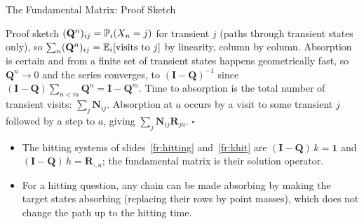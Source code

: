 \begin{frame}{The Fundamental Matrix: Proof Sketch}
  \label{fr:fundproof}
  \small
  \begin{block}{Proof sketch}
    $(\mathbf Q^n)_{ij}=\mathbb{P}_i(X_n=j)$ for transient $j$ (paths through transient states only), so $\sum_n(\mathbf Q^n)_{ij}=\mathbb{E}_i[\text{visits to } j]$ by linearity, column by column. Absorption is certain and from a finite set of transient states happens geometrically fast, so $\mathbf Q^n\to0$ and the series converges, to $(\mathbf I-\mathbf Q)^{-1}$ since $(\mathbf I-\mathbf Q)\sum_{n<m}\mathbf Q^n=\mathbf I-\mathbf Q^m$. Time to absorption is the total number of transient visits: $\sum_j\mathbf N_{ij}$. Absorption at $a$ occurs by a visit to some transient $j$ followed by a step to $a$, giving $\sum_j\mathbf N_{ij}\mathbf R_{ja}$. \hfill$\square$
  \end{block}
  \begin{itemize}
    \item The hitting systems of slides~\ref{fr:hitting} and~\ref{fr:khit} are $(\mathbf I-\mathbf Q)\,k=\mathbf 1$ and $(\mathbf I-\mathbf Q)\,h=\mathbf R_{\cdot,a}$; the fundamental matrix is their solution operator.
    \item For a hitting question, any chain can be made absorbing by making the target states absorbing (replacing their rows by point masses), which does not change the path up to the hitting time.
  \end{itemize}
\end{frame}

